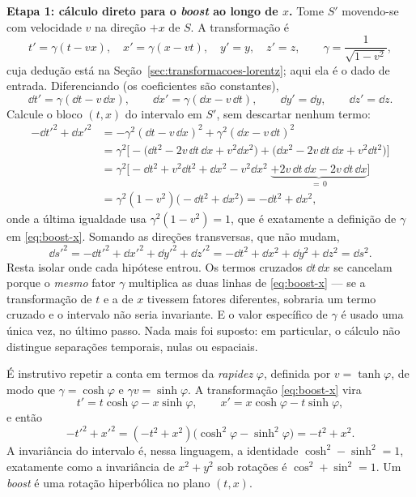 \documentclass[12pt,a4paper,oneside]{book}
\theoremstyle{rgplain}
\theoremstyle{rgremark}
\begin{document}
\textbf{Etapa 1: cálculo direto para o \emph{boost} ao longo de $x$.} Tome
$S'$ movendo-se com velocidade $v$ na direção $+x$ de $S$. A transformação é
\begin{equation}
  t'=\gamma(t-vx),\quad x'=\gamma(x-vt),\quad y'=y,\quad z'=z,
  \qquad \gamma=\frac{1}{\sqrt{1-v^2}} ,
  \label{eq:boost-x}
\end{equation}
cuja dedução está na Seção~\ref{sec:transformacoes-lorentz}; aqui ela é o dado
de entrada. Diferenciando (os coeficientes são constantes),
\[
  \dd t'=\gamma(\dd t-v\,\dd x),\qquad
  \dd x'=\gamma(\dd x-v\,\dd t),\qquad
  \dd y'=\dd y,\qquad \dd z'=\dd z.
\]
Calcule o bloco $(t,x)$ do intervalo em $S'$, sem descartar nenhum termo:
\[
\begin{aligned}
  -\dd t'^2+\dd x'^2
  &=-\gamma^2(\dd t-v\,\dd x)^2+\gamma^2(\dd x-v\,\dd t)^2\\[2pt]
  &=\gamma^2\Big[-\big(\dd t^2-2v\,\dd t\,\dd x+v^2\dd x^2\big)
                 +\big(\dd x^2-2v\,\dd t\,\dd x+v^2\dd t^2\big)\Big]\\[2pt]
  &=\gamma^2\Big[-\dd t^2+v^2\dd t^2+\dd x^2-v^2\dd x^2
                 \;\underbrace{+2v\,\dd t\,\dd x-2v\,\dd t\,\dd x}_{=\,0}\Big]\\[2pt]
  &=\gamma^2(1-v^2)\big(-\dd t^2+\dd x^2\big)
   =-\dd t^2+\dd x^2 ,
\end{aligned}
\]
onde a última igualdade usa $\gamma^2(1-v^2)=1$, que é exatamente a definição
de $\gamma$ em \eqref{eq:boost-x}. Somando as direções transversas, que não
mudam,
\[
  \dd s'^2=-\dd t'^2+\dd x'^2+\dd y'^2+\dd z'^2
         =-\dd t^2+\dd x^2+\dd y^2+\dd z^2=\dd s^2 .
\]
Resta isolar onde cada hipótese entrou. Os termos cruzados $\dd t\,\dd x$ se
cancelam porque o \emph{mesmo} fator $\gamma$ multiplica as duas linhas de
\eqref{eq:boost-x} --- se a transformação de $t$ e a de $x$ tivessem fatores
diferentes, sobraria um termo cruzado e o intervalo não seria invariante. E o
valor específico de $\gamma$ é usado uma única vez, no último passo. Nada mais
foi suposto: em particular, o cálculo não distingue separações temporais,
nulas ou espaciais.

É instrutivo repetir a conta em termos da \emph{rapidez} $\varphi$, definida
por $v=\tanh\varphi$, de modo que $\gamma=\cosh\varphi$ e
$\gamma v=\sinh\varphi$. A transformação \eqref{eq:boost-x} vira
\[
  t'=t\cosh\varphi-x\sinh\varphi,\qquad
  x'=x\cosh\varphi-t\sinh\varphi,
\]
e então
\[
  -t'^2+x'^2=(-t^2+x^2)\big(\cosh^2\varphi-\sinh^2\varphi\big)=-t^2+x^2 .
\]
A invariância do intervalo é, nessa linguagem, a identidade
$\cosh^2-\sinh^2=1$, exatamente como a invariância de $x^2+y^2$ sob rotações é
$\cos^2+\sin^2=1$. Um \emph{boost} é uma rotação hiperbólica no plano $(t,x)$.
\end{document}
